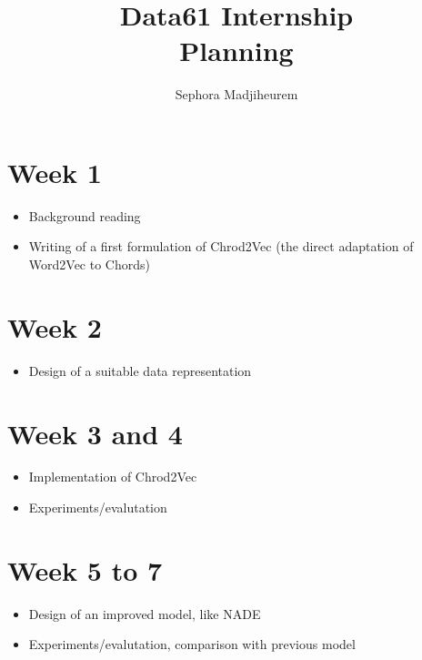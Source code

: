 \documentclass[12pt]{article}\pagestyle{myheadings}
\title{Data61 Internship \\ Planning}
\author{Sephora Madjiheurem}
\theoremstyle{plain}
\begin{document}
\maketitle


\section*{Week 1}
\begin{itemize}

\item Background reading
\item Writing of a first formulation of Chrod2Vec (the direct adaptation of Word2Vec to Chords)
\end{itemize}


\section*{Week 2}
\begin{itemize}
\item Design of a suitable data representation
\end{itemize}

\section*{Week 3 and 4}
\begin{itemize}
\item Implementation of Chrod2Vec 
\item Experiments/evalutation 
\end{itemize}

\section*{Week 5 to 7}
\begin{itemize}
\item Design of an improved model, like NADE 
\item Experiments/evalutation, comparison with previous model
\end{itemize}
\end{document}
